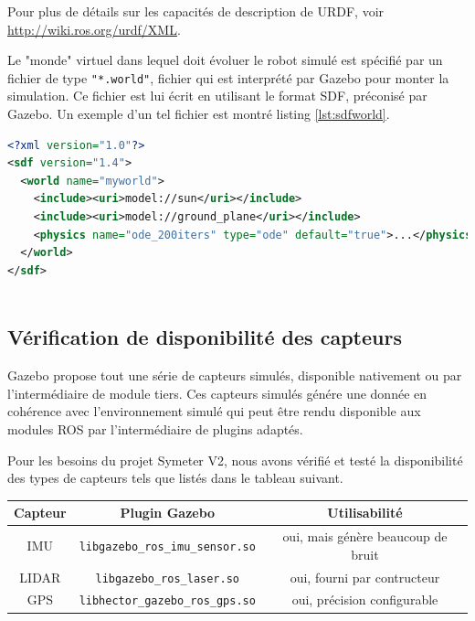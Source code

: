 \documentclass[12pt,a4paper]{report}
\begin{document}
		\para Pour plus de détails sur les capacités de description de URDF, voir  \href{http://wiki.ros.org/urdf/XML}{http://wiki.ros.org/urdf/XML}.
		
		\para Le "monde" virtuel dans lequel doit évoluer le robot simulé est spécifié par un fichier de type \verb|"*.world"|, fichier qui est interprété par Gazebo pour monter la simulation. Ce fichier est lui écrit en utilisant le format SDF, préconisé par Gazebo. Un exemple d'un tel fichier est montré listing \ref{lst:sdfworld}. 
		
		\begin{lstlisting}[caption={Exemple d'un fichier "*.world"},label={lst:sdfworld},language=XML,captionpos=b,basicstyle=\footnotesize]
<?xml version="1.0"?>
<sdf version="1.4">
  <world name="myworld">
    <include><uri>model://sun</uri></include>		
    <include><uri>model://ground_plane</uri></include>		
    <physics name="ode_200iters" type="ode" default="true">...</physics>
  </world>
</sdf>
		
		\end{lstlisting}
		
		
		
		
		\subsection{Vérification de disponibilité des capteurs}
		
		Gazebo propose tout une série de capteurs simulés, disponible nativement ou par l'intermédiaire de module tiers. Ces capteurs simulés génére une donnée en cohérence avec l'environnement simulé qui peut être rendu disponible aux modules ROS par l'intermédiaire de plugins adaptés.
		
		\para Pour les besoins du projet Symeter V2, nous avons vérifié et testé la disponibilité des types de capteurs tels que listés dans le tableau suivant.
		\newline
		
		\begin{center}
			
		\begin{tabular}{|c|c|c|}
			\hline 
			Capteur & Plugin Gazebo & Utilisabilité \\ 
			\hline 
			IMU & \verb|libgazebo_ros_imu_sensor.so| &  oui, mais génère beaucoup de bruit\\ 
			\hline 
			LIDAR & \verb|libgazebo_ros_laser.so|  & oui, fourni par contructeur \\ 
			\hline 
			GPS & \verb|libhector_gazebo_ros_gps.so| & oui, précision configurable \\ 
			\hline 
		\end{tabular} 
		\end{center}
	
\end{document}
